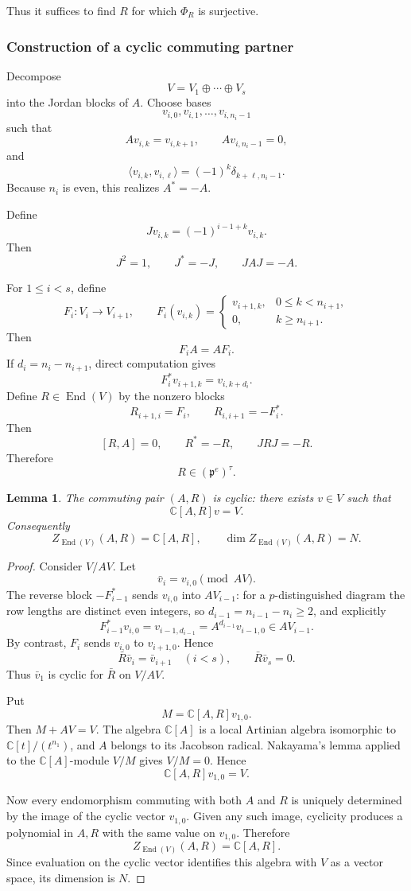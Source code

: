 \documentclass[10pt,a4paper]{amsart}
\numberwithin{equation}{section}
\newtheorem{lemma}[theorem]{Lemma}
\newcommand{\C}{\mathbb C}
\newcommand{\End}{\operatorname{End}}
\begin{document}
Thus it suffices to find \(R\) for which \(\Phi_R\) is surjective.

\subsubsection{Construction of a cyclic commuting partner}

Decompose
\[
V=V_1\oplus\cdots\oplus V_s
\]
into the Jordan blocks of \(A\).  Choose bases
\[
v_{i,0},v_{i,1},\ldots,v_{i,n_i-1}
\]
such that
\[
Av_{i,k}=v_{i,k+1},
\qquad
Av_{i,n_i-1}=0,
\]
and
\[
\langle v_{i,k},v_{i,\ell}\rangle
=
(-1)^k\delta_{k+\ell,n_i-1}.
\]
Because \(n_i\) is even, this realizes \(A^*=-A\).

Define
\[
Jv_{i,k}=(-1)^{i-1+k}v_{i,k}.
\]
Then
\[
J^2=1,\qquad
J^*=-J,\qquad
JAJ=-A.
\]

For \(1\leq i<s\), define
\[
F_i:V_i\to V_{i+1},
\qquad
F_i(v_{i,k})=
\begin{cases}
v_{i+1,k},&0\leq k<n_{i+1},\\
0,&k\geq n_{i+1}.
\end{cases}
\]
Then
\[
F_iA=AF_i.
\]
If \(d_i=n_i-n_{i+1}\), direct computation gives
\[
F_i^*v_{i+1,k}=v_{i,k+d_i}.
\]
Define \(R\in\End(V)\) by the nonzero blocks
\[
R_{i+1,i}=F_i,
\qquad
R_{i,i+1}=-F_i^*.
\]
Then
\[
[R,A]=0,\qquad
R^*=-R,\qquad
JRJ=-R.
\]
Therefore
\[
R\in(\mathfrak p^e)^\tau.
\]

\begin{lemma}\label{cii:lem:cyclic}
The commuting pair \((A,R)\) is cyclic: there exists \(v\in V\) such that
\[
\C[A,R]v=V.
\]
Consequently
\[
Z_{\End(V)}(A,R)=\C[A,R],
\qquad
\dim Z_{\End(V)}(A,R)=N.
\]
\end{lemma}

\begin{proof}
Consider \(V/AV\).  Let
\[
\bar v_i=v_{i,0}\pmod{AV}.
\]
The reverse block \(-F_{i-1}^*\) sends \(v_{i,0}\) into \(AV_{i-1}\):
for a $p$-distinguished diagram the row lengths are distinct even integers, so
\(d_{i-1}=n_{i-1}-n_i\ge2\), and explicitly
\[
 F_{i-1}^*v_{i,0}=v_{i-1,d_{i-1}}
   =A^{d_{i-1}}v_{i-1,0}\in AV_{i-1}.
\]
By contrast, \(F_i\) sends \(v_{i,0}\) to \(v_{i+1,0}\).  Hence
\[
\bar R\bar v_i=\bar v_{i+1}\quad(i<s),
\qquad
\bar R\bar v_s=0.
\]
Thus \(\bar v_1\) is cyclic for \(\bar R\) on \(V/AV\).

Put
\[
M=\C[A,R]v_{1,0}.
\]
Then \(M+AV=V\).  The algebra \(\C[A]\) is a local Artinian algebra
isomorphic to \(\C[t]/(t^{n_1})\), and \(A\) belongs to its Jacobson
radical.  Nakayama's lemma applied to the \(\C[A]\)-module \(V/M\)
gives \(V/M=0\).  Hence
\[
\C[A,R]v_{1,0}=V.
\]

Now every endomorphism commuting with both \(A\) and \(R\) is uniquely
determined by the image of the cyclic vector \(v_{1,0}\).  Given any such
image, cyclicity produces a polynomial in \(A,R\) with the same value on
\(v_{1,0}\).  Therefore
\[
Z_{\End(V)}(A,R)=\C[A,R].
\]
Since evaluation on the cyclic vector identifies this algebra with \(V\)
as a vector space, its dimension is \(N\).
\end{proof}
\end{document}
